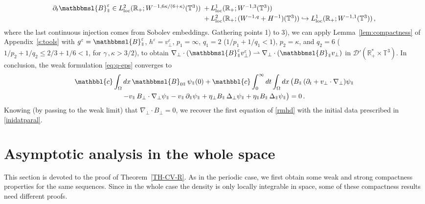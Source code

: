 \documentclass[11pt,reqno]{amsart}
\def \R{{\mathbb{R}}}
\def \T{{\mathbb{T}}}
\newcommand{\myparallel}{{\mkern3mu\vphantom{\perp}\vrule depth 0pt\mkern2mu\vrule depth 0pt\mkern3mu}}
\begin{document}
\[
\begin{array}{rl}
  \partial_t \mathbbmsl{B}_\myparallel^\varepsilon \in  L_{\rm loc}^{2}(\R_+; W^{-1,6\kappa/(6+\kappa)}(\T^3)) \! \! \! & + \, L_{\rm loc}^1(\R_+; W^{-1,3}(\T^3)) \smallskip \\
  \ & + \, L_{\rm loc}^{2}(\R_+; (W^{-1,q}+H^{-1})(\T^3)) \hookrightarrow  L_{\rm loc}^{1}(\R_+; W^{-1,1}(\T^3)) \, ,
\end{array}
\]
where the last continuous injection comes from Sobolev embeddings. Gathering points 1) to 3), we can apply  Lemma~\ref{lem:compactness} of Appendix~\ref{s:tools} with $g^\varepsilon = \mathbbmsl{ B}_\myparallel^\varepsilon$,  $h^\varepsilon = v_\perp^\varepsilon$, $p_1=\infty$, $q_1=2$ ($1/p_1+1/q_1 < 1$), $p_2=\kappa$, and $q_2=6$ ($1/p_2+1/q_2\leq 2/3+1/6 < 1$, for $\gamma\,, \kappa>3/2$), to obtain $ \nabla_\perp \cdot ( \mathbbmsl{B}_\myparallel^\varepsilon  v_\perp^\varepsilon )  \rightharpoonup \nabla_\perp \cdot (  \mathbbmsl{B}_\myparallel v_\perp)$ in $\mathcal D'(\R_+^* \times \T^3)$. In conclusion, the weak formulation \eqref{eq:q-eps} converges to
\begin{multline*}
 \mathbbl{c}
\int_\Omega dx \, \mathbbmsl{B}_{0\myparallel} \,  \psi_\myparallel(0) +  \mathbbl{c}
\int_0^\infty dt \int_\Omega dx \, \big( B_\myparallel \,  (\partial_t  + v_\perp \cdot \nabla_\perp ) \psi_\myparallel
\\
- v_\myparallel \,  B_\perp \cdot \nabla_\perp \psi_\myparallel
- v_\myparallel \, \partial_\myparallel  \psi_\myparallel
+ \eta_\perp B_{\myparallel} \, \Delta_\perp \psi_\myparallel + \eta_\myparallel B_{\myparallel } \, \Delta_\myparallel \psi_\myparallel
\big)
=0\, .
\end{multline*}
Knowing (by passing to the weak limit) that $ \nabla_\perp \cdot B_\perp = 0 $, we recover the first equation of \eqref{rmhd} with  the initial data prescribed in \eqref{inidatparal}.



\section{Asymptotic analysis in the whole space}
\label{s:AAWS}

This section is devoted to the proof of Theorem~\ref{TH-CV-R}. As in the periodic case, we first obtain some weak and strong compactness properties for the same sequences. Since in the whole case the density is only locally integrable in space, some of these compactness results need different proofs. 
\end{document}
